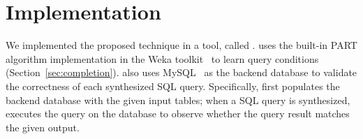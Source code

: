 
\section{Implementation}
\label{sec:implementation}
\vspace{-1mm}

We implemented the proposed technique in a tool, called \ourtool. 
\ourtool uses the built-in PART algorithm implementation in
the Weka toolkit~\cite{Hall:2009} to learn query conditions
(Section~\ref{sec:completion}). \ourtool also uses
MySQL~\cite{mysql} as the backend
database to validate the correctness of each synthesized 
SQL query. Specifically, \ourtool first populates the backend database
with the given input tables; when a SQL query is
synthesized, \ourtool executes the query on the database
to observe whether the query result matches the given output.
